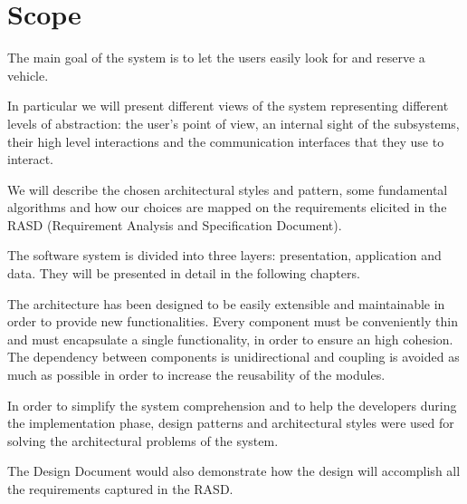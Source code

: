 \section{Scope}
The main goal of the system is to let the users easily look for and reserve a vehicle.

In particular we will present different views of the system representing different levels of abstraction: the user's point of view, an internal sight of the subsystems, their high level interactions and the communication interfaces that they use to interact.

We will describe the chosen architectural styles and pattern, some fundamental algorithms and how our choices are mapped
on the requirements elicited in the RASD (Requirement Analysis and Specification Document).

The software system is divided into three layers: presentation, application and data.
They will be presented in detail in the following chapters.

The architecture has been designed to be easily extensible and maintainable in order to provide new functionalities.
Every component must be conveniently thin and must encapsulate a single functionality, in order to ensure an high cohesion.
The dependency between components is unidirectional and coupling is avoided as much as possible in order to increase the
reusability of the modules.

In order to simplify the system comprehension and to help the developers during the implementation phase, design patterns and architectural styles were used for solving the architectural problems of the system.

The Design Document would also demonstrate how the design will accomplish all the requirements captured in the RASD.